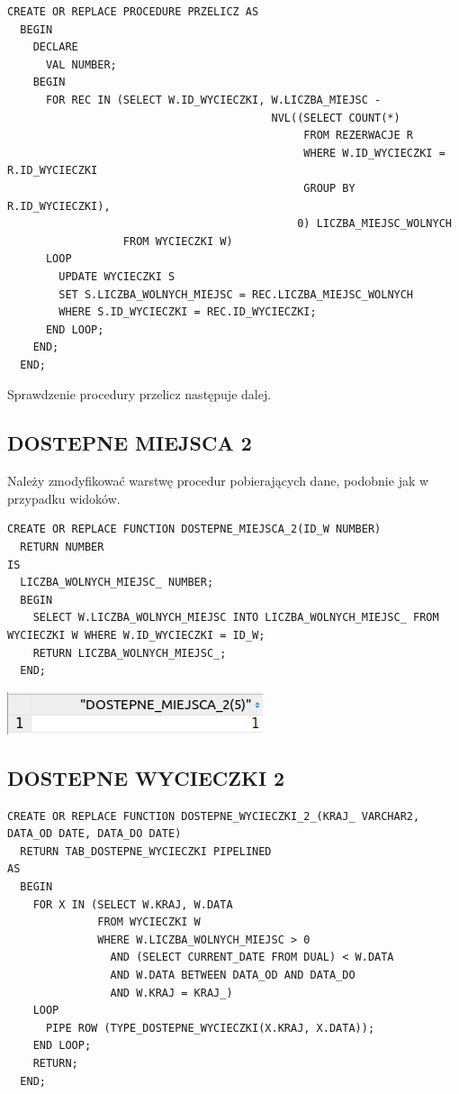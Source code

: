 \begin{verbatim}
CREATE OR REPLACE PROCEDURE PRZELICZ AS
  BEGIN
    DECLARE
      VAL NUMBER;
    BEGIN
      FOR REC IN (SELECT W.ID_WYCIECZKI, W.LICZBA_MIEJSC -
                                         NVL((SELECT COUNT(*)
                                              FROM REZERWACJE R
                                              WHERE W.ID_WYCIECZKI = R.ID_WYCIECZKI
                                              GROUP BY R.ID_WYCIECZKI),
                                             0) LICZBA_MIEJSC_WOLNYCH
                  FROM WYCIECZKI W)
      LOOP
        UPDATE WYCIECZKI S
        SET S.LICZBA_WOLNYCH_MIEJSC = REC.LICZBA_MIEJSC_WOLNYCH
        WHERE S.ID_WYCIECZKI = REC.ID_WYCIECZKI;
      END LOOP;
    END;
  END;
\end{verbatim}

Sprawdzenie procedury przelicz następuje dalej.

\subsection{DOSTEPNE MIEJSCA 2}
Należy zmodyfikować warstwę procedur pobierających dane, podobnie jak w przypadku
widoków.

\begin{verbatim}
CREATE OR REPLACE FUNCTION DOSTEPNE_MIEJSCA_2(ID_W NUMBER)
  RETURN NUMBER
IS
  LICZBA_WOLNYCH_MIEJSC_ NUMBER;
  BEGIN
    SELECT W.LICZBA_WOLNYCH_MIEJSC INTO LICZBA_WOLNYCH_MIEJSC_ FROM WYCIECZKI W WHERE W.ID_WYCIECZKI = ID_W;
    RETURN LICZBA_WOLNYCH_MIEJSC_;
  END;
\end{verbatim}

\begin{minipage}{0.40\textwidth}
\includegraphics[width=\linewidth]{./images/dostepne_miejsca_2.png}
\end{minipage}

\subsection{DOSTEPNE WYCIECZKI 2}
\begin{verbatim}
CREATE OR REPLACE FUNCTION DOSTEPNE_WYCIECZKI_2_(KRAJ_ VARCHAR2, DATA_OD DATE, DATA_DO DATE)
  RETURN TAB_DOSTEPNE_WYCIECZKI PIPELINED
AS
  BEGIN
    FOR X IN (SELECT W.KRAJ, W.DATA
              FROM WYCIECZKI W
              WHERE W.LICZBA_WOLNYCH_MIEJSC > 0
                AND (SELECT CURRENT_DATE FROM DUAL) < W.DATA
                AND W.DATA BETWEEN DATA_OD AND DATA_DO
                AND W.KRAJ = KRAJ_)
    LOOP
      PIPE ROW (TYPE_DOSTEPNE_WYCIECZKI(X.KRAJ, X.DATA));
    END LOOP;
    RETURN;
  END;
\end{verbatim}

